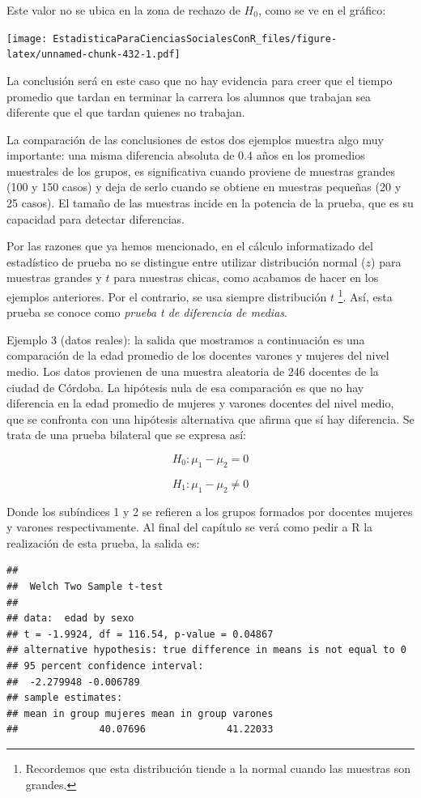 \documentclass[]{book}
\let\rmarkdownfootnote\footnote%
\def\footnote{\protect\rmarkdownfootnote}
\begin{document}
Este valor no se ubica en la zona de rechazo de \(H_{0}\), como se ve en el gráfico:

\texttt{[image: EstadisticaParaCienciasSocialesConR\_files/figure-latex/unnamed-chunk-432-1.pdf]}

La conclusión será en este caso que no hay evidencia para creer que el
tiempo promedio que tardan en terminar la carrera los alumnos que
trabajan sea diferente que el que tardan quienes no trabajan.

La comparación de las conclusiones de estos dos ejemplos muestra algo
muy importante: una misma diferencia absoluta de 0.4 años en los
promedios muestrales de los grupos, es significativa cuando proviene de
muestras grandes (100 y 150 casos) y deja de serlo cuando se obtiene en
muestras pequeñas (20 y 25 casos). El tamaño de las muestras incide en
la potencia de la prueba, que es su capacidad para detectar diferencias.

Por las razones que ya hemos mencionado, en el cálculo informatizado del estadístico de prueba no se distingue entre utilizar distribución normal (\(z\)) para muestras grandes y \(t\) para muestras chicas, como
acabamos de hacer en los ejemplos anteriores. Por el contrario, se usa
siempre distribución \(t\) \footnote{Recordemos que esta distribución tiende a la normal cuando las muestras son grandes.}. Así, esta prueba se conoce como \emph{prueba t de diferencia de medias}.

Ejemplo 3 (datos reales): la salida que mostramos a continuación es una
comparación de la edad promedio de los docentes varones y mujeres del
nivel medio. Los datos provienen de una muestra aleatoria de 246
docentes de la ciudad de Córdoba. La hipótesis nula de esa comparación
es que no hay diferencia en la edad promedio de mujeres y varones
docentes del nivel medio, que se confronta con una hipótesis alternativa
que afirma que sí hay diferencia. Se trata de una prueba bilateral que
se expresa así:

\[H_{0}:\mu_{1} - \mu_{2} = 0\]

\[H_{1}:\mu_{1} - \mu_{2} \neq 0\]

Donde los subíndices 1 y 2 se refieren a los grupos formados por
docentes mujeres y varones respectivamente. Al final del capítulo se verá como pedir a R la realización de esta prueba, la salida es:

\begin{verbatim}
## 
##  Welch Two Sample t-test
## 
## data:  edad by sexo
## t = -1.9924, df = 116.54, p-value = 0.04867
## alternative hypothesis: true difference in means is not equal to 0
## 95 percent confidence interval:
##  -2.279948 -0.006789
## sample estimates:
## mean in group mujeres mean in group varones 
##              40.07696              41.22033
\end{verbatim}
\end{document}
